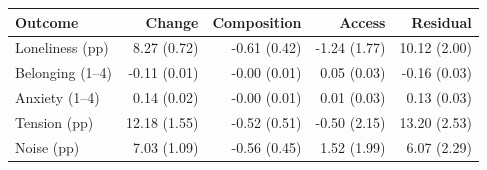 \begin{tabular}{@{}lrrrr@{}}
\toprule
Outcome & Change & Composition & Access & Residual\\
\midrule
Loneliness (pp) & 8.27 (0.72) & -0.61 (0.42) & -1.24 (1.77) & 10.12 (2.00)\\
Belonging (1--4) & -0.11 (0.01) & -0.00 (0.01) & 0.05 (0.03) & -0.16 (0.03)\\
Anxiety (1--4) & 0.14 (0.02) & -0.00 (0.01) & 0.01 (0.03) & 0.13 (0.03)\\
Tension (pp) & 12.18 (1.55) & -0.52 (0.51) & -0.50 (2.15) & 13.20 (2.53)\\
Noise (pp) & 7.03 (1.09) & -0.56 (0.45) & 1.52 (1.99) & 6.07 (2.29)\\
\bottomrule
\end{tabular}
